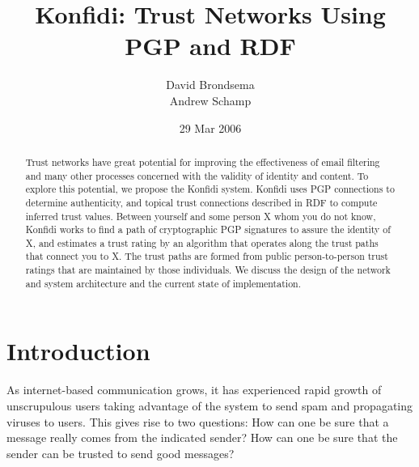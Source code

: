 \documentclass[letterpaper]{www2006-submission}
\begin{document}

\title{Konfidi: Trust Networks Using PGP and RDF}


\author{
\alignauthor David Brondsema\\
\alignauthor Andrew Schamp\\
}

\date{29 Mar 2006}

\maketitle
\begin{abstract}
Trust networks have great potential for improving the effectiveness of email filtering and many other processes concerned with the validity of identity and content.  To explore this potential, we propose the Konfidi system.  Konfidi uses PGP connections to determine authenticity, and topical trust connections described in RDF to compute inferred trust values.  Between yourself and some person X whom you do not know, Konfidi works to find a path of cryptographic PGP signatures to assure the identity of X, and estimates a trust rating by an algorithm that operates along the trust paths that connect you to X.  The trust paths are formed from public person-to-person trust ratings that are maintained by those individuals.  We discuss the design of the network and system architecture and the current state of implementation.
\end{abstract}


\section{Introduction}
As internet-based communication grows, it has experienced rapid growth of unscrupulous users taking advantage of the system to send spam and propagating viruses to users.  This gives rise to two questions: 
How can one be sure that a message really comes from the indicated sender?  How can one be sure that the sender can be trusted to send good messages?
\end{document}
